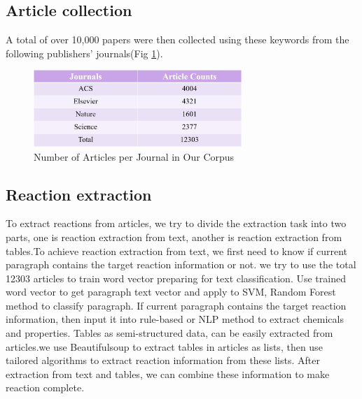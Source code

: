 \documentclass[%
 aip,
 jmp,%
 amsmath,amssymb,
 reprint,%
]{revtex4-2}
\begin{document}
\subsection{Article collection}
A total of over 10,000 papers were then collected using these keywords from the following publishers' journals(Fig \ref{ Fig.6 }).
\begin{figure}[htbp]
 \centering
 \includegraphics[width=0.7\textwidth]{figure/6.png}
 \caption{ Number of Articles per Journal in Our Corpus }
 \label{ Fig.6 }
\end{figure}
\subsection{Reaction extraction}
To extract reactions from articles, we try to divide the extraction task into two parts, one is reaction extraction from text, 
another is reaction extraction from tables.To achieve reaction extraction from text, we first need to know if current paragraph
contains the target reaction information or not.
we try to use the total 12303 articles to train word vector preparing for text classification.
Use trained word vector to get paragraph text vector and apply to SVM, Random Forest method to classify paragraph.
If current paragraph contains the target reaction information, then input it into rule-based or NLP method to extract
chemicals and properties.
Tables as semi-structured data, can be easily extracted from articles.we use Beautifulsoup to extract tables in articles as lists,
then use tailored algorithms to extract reaction information from these lists. 
After extraction from text and tables, we can combine these information to make reaction complete.
\end{document}
